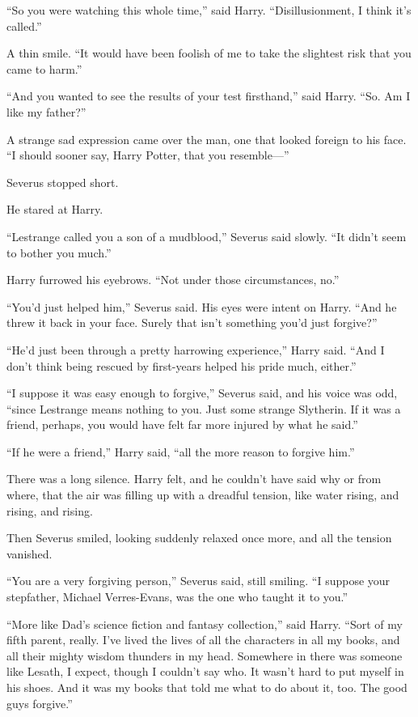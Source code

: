 ``So you were watching this whole time,'' said Harry. ``Disillusionment,
I think it's called.''

A thin smile. ``It would have been foolish of me to take the slightest
risk that you came to harm.''

``And you wanted to see the results of your test firsthand,'' said
Harry. ``So. Am I like my father?''

A strange sad expression came over the man, one that looked foreign to
his face. ``I should sooner say, Harry Potter, that you resemble---''

Severus stopped short.

He stared at Harry.

``Lestrange called you a son of a mudblood,'' Severus said slowly. ``It
didn't seem to bother you much.''

Harry furrowed his eyebrows. ``Not under those circumstances, no.''

``You'd just helped him,'' Severus said. His eyes were intent on Harry.
``And he threw it back in your face. Surely that isn't something you'd
just forgive?''

``He'd just been through a pretty harrowing experience,'' Harry said.
``And I don't think being rescued by first-years helped his pride much,
either.''

``I suppose it was easy enough to forgive,'' Severus said, and his voice
was odd, ``since Lestrange means nothing to you. Just some strange
Slytherin. If it was a friend, perhaps, you would have felt far more
injured by what he said.''

``If he were a friend,'' Harry said, ``all the more reason to forgive
him.''

There was a long silence. Harry felt, and he couldn't have said why or
from where, that the air was filling up with a dreadful tension, like
water rising, and rising, and rising.

Then Severus smiled, looking suddenly relaxed once more, and all the
tension vanished.

``You are a very forgiving person,'' Severus said, still smiling. ``I
suppose your stepfather, Michael Verres-Evans, was the one who taught it
to you.''

``More like Dad's science fiction and fantasy collection,'' said Harry.
``Sort of my fifth parent, really. I've lived the lives of all the
characters in all my books, and all their mighty wisdom thunders in my
head. Somewhere in there was someone like Lesath, I expect, though I
couldn't say who. It wasn't hard to put myself in his shoes. And it was
my books that told me what to do about it, too. The good guys forgive.''

